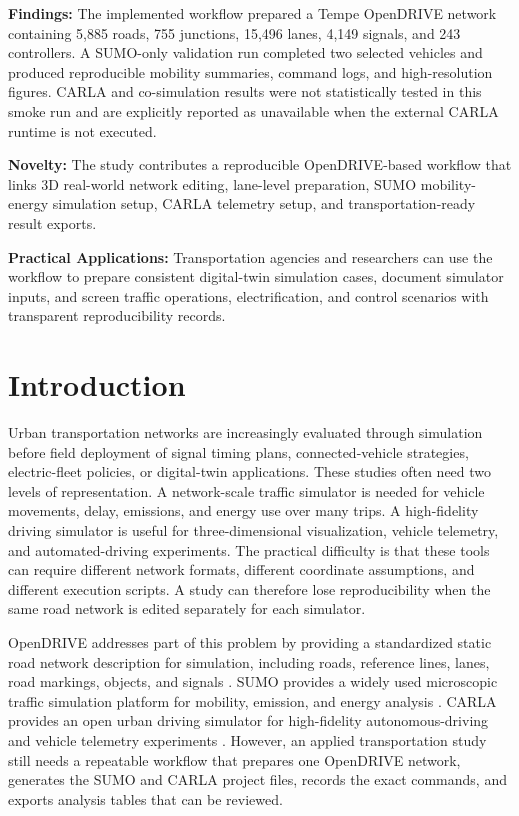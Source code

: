 \documentclass[10pt,numbered]{\selectedmanuscriptclass}
\begin{document}
\par\numberedblankline
\noindent\textbf{Findings:} The implemented workflow prepared a Tempe
OpenDRIVE network containing 5,885 roads, 755 junctions, 15,496 lanes, 4,149
signals, and 243 controllers. A SUMO-only validation run completed two selected
vehicles and produced reproducible mobility summaries, command logs, and
high-resolution figures. CARLA and co-simulation results were not statistically
tested in this smoke run and are explicitly reported as unavailable when the
external CARLA runtime is not executed.

\par\numberedblankline
\noindent\textbf{Novelty:} The study contributes a reproducible OpenDRIVE-based
workflow that links 3D real-world network editing, lane-level preparation, SUMO
mobility-energy simulation setup, CARLA telemetry setup, and
transportation-ready result exports.

\par\numberedblankline
\noindent\textbf{Practical Applications:} Transportation agencies and researchers
can use the workflow to prepare consistent digital-twin simulation cases,
document simulator inputs, and screen traffic operations, electrification, and
control scenarios with transparent reproducibility records.
\par\endgroup
\newpage

\section{Introduction}\label{sec:intro}

Urban transportation networks are increasingly evaluated through simulation
before field deployment of signal timing plans, connected-vehicle strategies,
electric-fleet policies, or digital-twin applications. These studies often need
two levels of representation. A network-scale traffic simulator is needed for
vehicle movements, delay, emissions, and energy use over many trips. A
high-fidelity driving simulator is useful for three-dimensional visualization,
vehicle telemetry, and automated-driving experiments. The practical difficulty is
that these tools can require different network formats, different coordinate
assumptions, and different execution scripts. A study can therefore lose
reproducibility when the same road network is edited separately for each
simulator.

OpenDRIVE addresses part of this problem by providing a standardized static road
network description for simulation, including roads, reference lines, lanes,
road markings, objects, and signals \citep{asam2026opendrive}. SUMO provides a
widely used microscopic traffic simulation platform for mobility, emission, and
energy analysis \citep{alvarezlopez2018sumo}. CARLA provides an open urban
driving simulator for high-fidelity autonomous-driving and vehicle telemetry
experiments \citep{dosovitskiy2017carla}. However, an applied transportation
study still needs a repeatable workflow that prepares one OpenDRIVE network,
generates the SUMO and CARLA project files, records the exact commands, and
exports analysis tables that can be reviewed.
\end{document}
